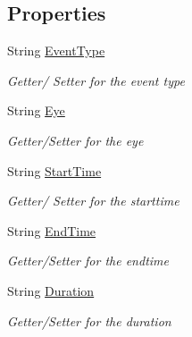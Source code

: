 \subsection*{Properties}
\begin{DoxyCompactItemize}
\item 
String \hyperlink{class_web_analyzer_1_1_models_1_1_base_1_1_raw_tracking_event_a343b4b2132c9e961a5e08c7f65d238b4}{Event\+Type}
\begin{DoxyCompactList}\small\item\em Getter/ Setter for the event type \end{DoxyCompactList}\item 
String \hyperlink{class_web_analyzer_1_1_models_1_1_base_1_1_raw_tracking_event_aba0acbf6ec78782d58fe36422b344cbc}{Eye}
\begin{DoxyCompactList}\small\item\em Getter/\+Setter for the eye \end{DoxyCompactList}\item 
String \hyperlink{class_web_analyzer_1_1_models_1_1_base_1_1_raw_tracking_event_a1af115e943c8a05d912c9370e8c9af36}{Start\+Time}
\begin{DoxyCompactList}\small\item\em Getter/ Setter for the starttime \end{DoxyCompactList}\item 
String \hyperlink{class_web_analyzer_1_1_models_1_1_base_1_1_raw_tracking_event_af8461a9b6079b72385d42ec453e8ecf2}{End\+Time}
\begin{DoxyCompactList}\small\item\em Getter/\+Setter for the endtime \end{DoxyCompactList}\item 
String \hyperlink{class_web_analyzer_1_1_models_1_1_base_1_1_raw_tracking_event_a9e7f104978e7aac39ab700856229aecf}{Duration}
\begin{DoxyCompactList}\small\item\em Getter/\+Setter for the duration \end{DoxyCompactList}\item 

\end{DoxyCompactItemize}
